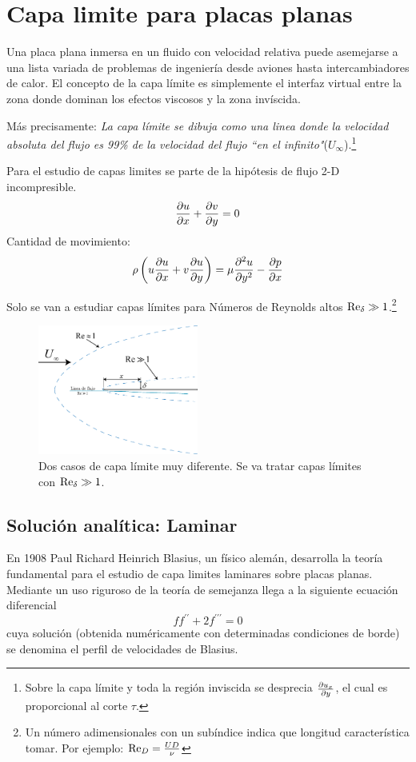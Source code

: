 \newcommand{\dstar}{\delta^{*}}
\section{Capa limite para placas planas}
Una placa plana inmersa en un fluido con velocidad relativa puede asemejarse a una lista variada de problemas de ingeniería desde aviones hasta intercambiadores de calor. El concepto de la capa límite es simplemente el interfaz virtual entre la zona donde dominan los efectos viscosos y la zona invíscida. 

Más precisamente:\textit{ La capa límite se dibuja como una linea donde la velocidad absoluta del flujo es 99\% de la velocidad del flujo ``en el infinito"{}}($U_\infty$).\footnote{Sobre la capa límite y toda la región inviscida se desprecia $\frac{\partial u_x}{\partial y}$, el cual es proporcional al corte $\tau$.}

 Para el estudio de capas limites se parte de la hipótesis de flujo 2-D incompresible.
 \[
 \frac{\partial u}{\partial x}+\frac{\partial v}{\partial y}=0
 \]
 Cantidad de movimiento:
\[
\rho\left(u\frac{\partial u}{\partial x}+v\frac{\partial u}{\partial y}\right)=\mu \frac{\partial^2 u}{\partial y ^2}-\frac{\partial p}{\partial x}
\]

Solo se van a estudiar capas límites para Números de Reynolds altos $\textrm{Re}_\delta\gg 1$.\footnote{Un número adimensionales con un subíndice indica que longitud característica tomar. Por ejemplo: $\textrm{Re}_D= \frac{UD}{\nu}$}

\begin{figure}%
    \centering
    \includegraphics[width=0.47\textwidth]{fig/BL1.eps}
    \caption{Dos casos de capa límite muy diferente. Se va tratar capas límites con $\textrm{Re}_\delta \gg1$.}
    \label{fig:BLintro}
\end{figure}
\subsection{Solución analítica: Laminar}
En 1908 Paul Richard Heinrich Blasius, un físico alemán, desarrolla la teoría fundamental para el estudio de capa limites laminares sobre placas planas. Mediante un uso riguroso de la teoría de semejanza llega a la siguiente ecuación diferencial
\[
ff^{\prime\prime}+2f^{\prime\prime\prime}=0
\]
cuya solución (obtenida numéricamente con determinadas condiciones de borde) se denomina el perfil de velocidades de Blasius.


